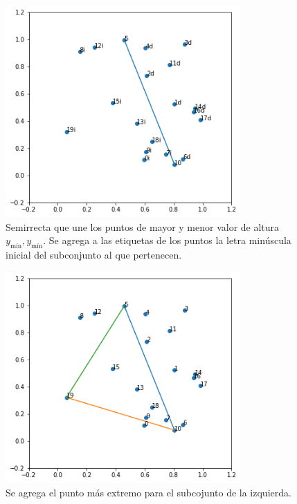 \documentclass[paper=leter, fontsize=11pt]{scrartcl}
\numberwithin{equation}{section}		%
\numberwithin{figure}{section}			%
\numberwithin{table}{section}				%
\begin{document}
\begin{figure}
    \centering
    \includegraphics[width=0.8\textwidth]{1.png}
    \caption{Semirrecta que une los puntos de mayor y menor valor de altura $y_{\text{mín}}, y_{\text{mín}}$. Se agrega a las etiquetas de los puntos la letra minúscula inicial del subconjunto al que pertenecen.}
    \label{1}
\end{figure}

\begin{figure}
    \centering
    \includegraphics[width=0.8\textwidth]{2.png}
    \caption{Se agrega el punto más extremo para el subcojunto de la izquierda.}
    \label{2}
\end{figure}
\end{document}
